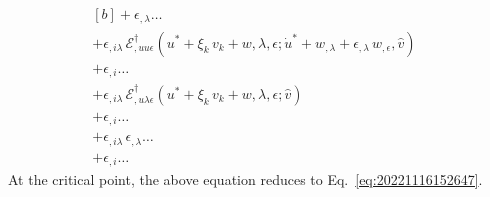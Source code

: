 \documentclass[12pt, final]{scrartcl}
\theoremstyle{definition}
\newcommand{\EE}{\mathcal E ^ \dagger}
\begin{document}
\begin{equation}
\begin{aligned}[b]
    + \epsilon_{,\lambda} \ldots &\\
    + \epsilon_{,i\lambda} \, \EE_{,uu\epsilon}(u^\ast + \xi_k \, v_k + w, \lambda, \epsilon; \dot{u}^\ast + w_{,\lambda} + \epsilon_{,\lambda} \, w_{,\epsilon}, \hat{v}) &\\
    + \epsilon_{,i} \ldots &\\
    + \epsilon_{,i\lambda} \, \EE_{,u\lambda\epsilon}(u^\ast + \xi_k \, v_k + w, \lambda, \epsilon; \hat{v}) &\\
    + \epsilon_{,i} \ldots &\\
    + \epsilon_{,i\lambda} \, \epsilon_{,\lambda} \ldots &\\
    + \epsilon_{,i} \ldots
  \end{aligned}
\end{equation}
At the critical point, the above equation reduces to Eq.~\eqref{eq:20221116152647}.
\end{document}
